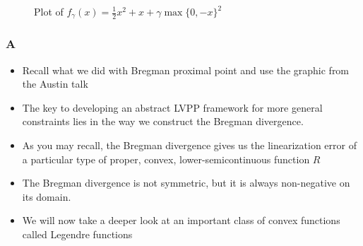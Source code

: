 \documentclass[aspectratio=169,xcolor=dvipsnames,11pt]{beamer}
\begin{document}
\begin{frame}
\begin{minipage}{0.3\linewidth}
\begin{figure}
\caption{\scriptsize Plot of $f_\gamma(x) = \frac{1}{2} x^2 + x + \gamma\max\{0,-x\}^2$}
  \label{fig:tikz-example}
\end{figure}
\end{minipage}
  \end{frame}

\begin{frame}\frametitle{A}
\begin{itemize}
\item Recall what we did with Bregman proximal point and use the graphic from the Austin talk
\item The key to developing an abstract LVPP framework for more general constraints lies in the way we construct the Bregman divergence.
\item As you may recall, the Bregman divergence gives us the linearization error of a particular type of proper, convex, lower-semicontinuous function $R$
\item The Bregman divergence is not symmetric, but it is always non-negative on its domain.
\item We will now take a deeper look at an important class of convex functions called \alert{Legendre functions}
\end{itemize}
\end{frame}
\end{document}
